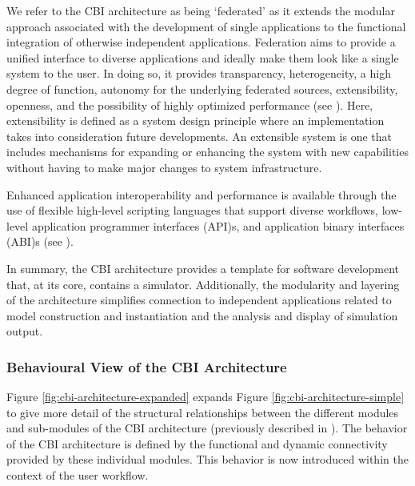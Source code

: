 \documentclass{article}
\begin{document}
We refer to the CBI architecture as being `federated' as it extends
the modular approach associated with the development of single
applications to the functional integration of otherwise independent
applications.  Federation aims to provide a unified interface to
diverse applications and ideally make them look like a single
system to the user. In doing so, it provides transparency, heterogeneity, a high
degree of function, autonomy for the underlying federated sources,
extensibility, openness, and the possibility of highly optimized
performance (see \cite{federated-2002-xyz}). Here, extensibility is defined as a system design
principle where an implementation takes into consideration future
developments. An extensible system is one that includes mechanisms for
expanding or enhancing the system with new capabilities without having
to make major changes to system infrastructure. 

Enhanced application interoperability and performance is available
through the use of flexible high-level scripting languages that support
diverse workflows, low-level application programmer interfaces
(API)s, and application binary interfaces (ABI)s (see \cite{Cornelis:2011fk}).


In summary, the CBI architecture provides a template for software
development that, at its core, contains a simulator.  Additionally,
the modularity and layering of the architecture simplifies connection
to independent applications related to model construction
and instantiation and the analysis and display of simulation output.

\subsubsection{Behavioural View of the CBI Architecture}

Figure \ref{fig:cbi-architecture-expanded} expands Figure \ref{fig:cbi-architecture-simple} to give more
detail of the structural relationships between the different modules and
sub-modules of the CBI architecture (previously described in \cite{10.1371/journal.pone.0028956}). The behavior of
the CBI architecture is defined by the functional and dynamic
connectivity provided by these individual modules. This behavior is now introduced within the context of the user workflow.
\end{document}
